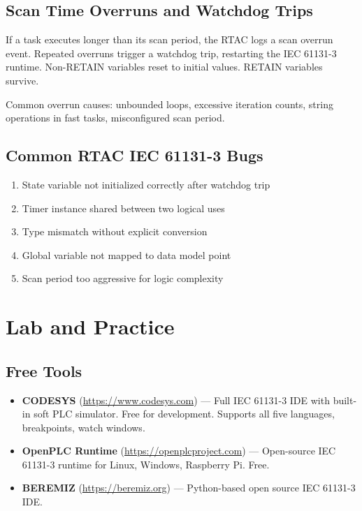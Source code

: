 \documentclass[12pt,twoside,openright]{memoir}
\begin{document}
\section{Scan Time Overruns and Watchdog Trips}

If a task executes longer than its scan period, the RTAC logs a scan overrun event. Repeated overruns trigger a watchdog trip, restarting the IEC 61131-3 runtime. Non-RETAIN variables reset to initial values. RETAIN variables survive.

Common overrun causes: unbounded loops, excessive iteration counts, string operations in fast tasks, misconfigured scan period.

\section{Common RTAC IEC 61131-3 Bugs}

\begin{enumerate}
  \item State variable not initialized correctly after watchdog trip
  \item Timer instance shared between two logical uses
  \item Type mismatch without explicit conversion
  \item Global variable not mapped to data model point
  \item Scan period too aggressive for logic complexity
\end{enumerate}

\chapter{Lab and Practice}

\section{Free Tools}

\begin{itemize}
  \item \textbf{CODESYS} (\url{https://www.codesys.com}) --- Full IEC 61131-3 IDE with built-in soft PLC simulator. Free for development. Supports all five languages, breakpoints, watch windows.
  \item \textbf{OpenPLC Runtime} (\url{https://openplcproject.com}) --- Open-source IEC 61131-3 runtime for Linux, Windows, Raspberry Pi. Free.
  \item \textbf{BEREMIZ} (\url{https://beremiz.org}) --- Python-based open source IEC 61131-3 IDE.
\end{itemize}
\end{document}

